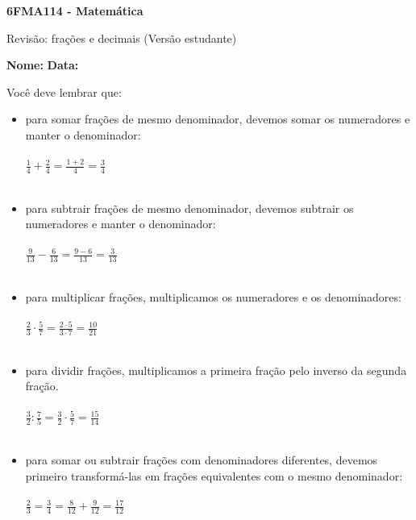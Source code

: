 \documentclass[a4paper,14pt]{article}
\begin{document}
	
	\noindent\textbf{6FMA114 - Matemática} 
	
	\begin{center}Revisão: frações e decimais (Versão estudante)
	\end{center}
	
	\noindent\textbf{Nome:} \underline{\hspace{10cm}}
	\noindent\textbf{Data:} \underline{\hspace{4cm}}
	
	
	\begin{multicols}{2}
		\noindent Você deve lembrar que: \begin{itemize} 
		\item para somar frações de mesmo denominador, devemos somar os numeradores e manter o denominador: \\\\
		$\frac{1}{4} + \frac{2}{4} = \frac{1 + 2}{4} = \frac{3}{4}$ \\\\
		\item para subtrair frações de mesmo denominador, devemos subtrair os numeradores e manter o denominador: \\\\
		$\frac{9}{13} - \frac{6}{13} = \frac{9 - 6}{13} = \frac{3}{13}$ \\\\
		\item para multiplicar frações, multiplicamos os numeradores e os denominadores: \\\\
		$\frac{2}{3} \cdot \frac{5}{7} = \frac{2 \cdot 5}{3 \cdot 7} = \frac{10}{21}$ \\\\
		\item para dividir frações, multiplicamos a primeira fração pelo inverso da segunda fração. \\\\
		$\frac{3}{2} : \frac{7}{5} = \frac{3}{2} \cdot \frac{5}{7} = \frac{15}{14}$ \\\\
		\item para somar ou subtrair frações com denominadores diferentes, devemos primeiro transformá-las em frações equivalentes com o mesmo denominador: \\\\
		$\frac{2}{3} = \frac{3}{4} = \frac{8}{12} + \frac{9}{12} = \frac{17}{12}$
		\end{itemize}
	\end{multicols}
\end{document}
